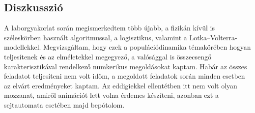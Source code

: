 \begin{multicols}{2}
\section{Diszkusszió} \label{sec:7}
A laborgyakorlat során megismerkedtem több újabb, a fizikán kívül is széleskörben használt algoritmussal, a logisztikus, valamint a Lotka--Volterra-modellekkel. Megvizsgáltam, hogy ezek a populációdinamika témakörében hogyan teljesítenek és az elméletekkel megegyező, a valósággal is összecsengő karakterisztikával rendelkező numkerikus megoldásokat kaptam. Habár az összes feladatot teljesíteni nem volt időm, a megoldott feladatok során minden esetben az elvárt eredményeket kaptam. Az eddigiekkel ellentétben itt nem volt olyan mozzanat, amiről animációt lett volna érdemes készíteni, azonban ezt a sejtautomata esetében majd bepótolom. 

\end{multicols}